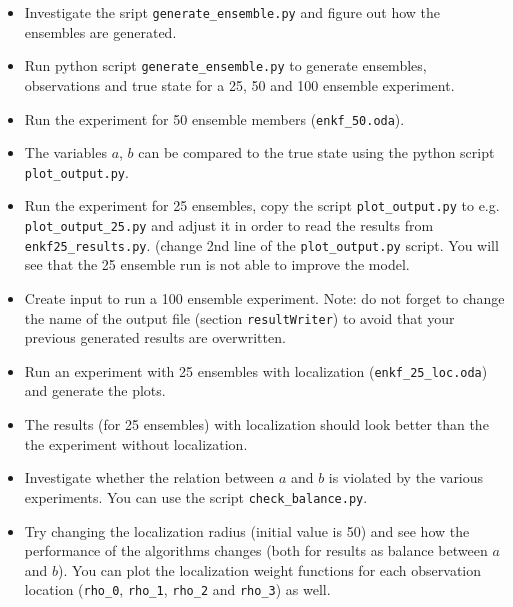 \begin{itemize}
\item Investigate the sript {\tt generate\_ensemble.py} and figure out how the ensembles are generated.
\item Run python script {\tt generate\_ensemble.py} to generate ensembles, observations and true state for a 25, 50 and 100 ensemble experiment.  
\item Run the experiment for 50 ensemble members ({\tt enkf\_50.oda}).
\item The variables $a$, $b$ can be compared to the true state using the python script {\tt plot\_output.py}.
\item Run the experiment for 25 ensembles, copy the script {\tt plot\_output.py} to e.g. {\tt plot\_output\_25.py} and adjust it in order to read the results from {\tt enkf25\_results.py}.
(change 2nd line of the {\tt plot\_output.py} script. You will see that the 25 ensemble run is not able to improve the model.
\item Create input to run a 100 ensemble experiment. Note: do not forget to change the name of the output file (section {\tt resultWriter}) 
to avoid that your previous generated results are overwritten. 
\item Run an experiment with 25 ensembles with localization ({\tt enkf\_25\_loc.oda}) and generate the plots.
\item The results (for 25 ensembles) with localization should look better than the the experiment without localization.
\item Investigate whether the relation between $a$ and $b$ is violated by the various experiments. You can use the script {\tt check\_balance.py}.
\item Try changing the localization radius (initial value is 50) and see how the performance of the algorithms changes (both for results as balance between $a$ and $b$). You can plot the localization weight functions for each observation location ({\tt rho\_0}, {\tt rho\_1}, {\tt rho\_2} and {\tt rho\_3}) as well.
\end{itemize}








